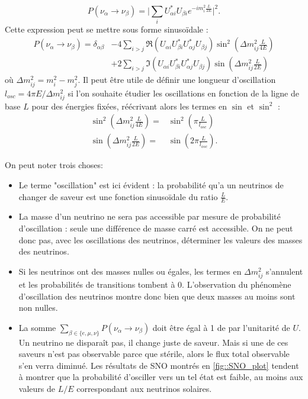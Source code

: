             \begin{equation*}
                P(\nu_{\alpha}\to\nu_{\beta}) = \bigg|\sum_i U_{\alpha i}^*U_{\beta i} e^{-im_i^2\frac{L}{2E}}\bigg|^2.
            \end{equation*}
            Cette expression peut se mettre sous forme sinusoïdale\cite{Mondal2015} :
            \begin{equation}\label{eq::proba_oscillation}
                \begin{split}
                    P(\nu_{\alpha}\to\nu_{\beta}) = \delta_{\alpha\beta} & - 4\sum_{i>j}\Re(U_{\alpha i}U_{\beta i}^*U_{\alpha j}^*U_{\beta j})\sin^2\left(\Delta m_{ij}^2\frac{L}{4E}\right) \\
                    & +2\sum_{i>j}\Im(U_{\alpha i}U_{\beta i}^*U_{\alpha j}^*U_{\beta j})\sin\left(\Delta m_{ij}^2\frac{L}{2E}\right)
                \end{split}
            \end{equation}
            où $\Delta m_{ij}^2 = m_i^2-m_j^2$. Il peut être utile de définir une longueur d'oscillation $l_{osc} = 4\pi E/\Delta m_{ij}^2$ si l'on souhaite étudier les oscillations en fonction de la ligne de base $L$ pour des énergies fixées, réécrivant alors les termes en $\sin$ et $\sin^2$ :
            \begin{eqnarray}
                \sin^2\left(\Delta m_{ij}^2\frac{L}{4E}\right) = &  \sin^2\left(\pi\frac{L}{l_{osc}}\right) \\
                \sin\left(\Delta m_{ij}^2\frac{L}{2E}\right) = & \sin\left(2\pi\frac{L}{l_{osc}}\right).
            \end{eqnarray}
            
            On peut noter trois choses:
            \begin{itemize}
                \item Le terme "oscillation" est ici évident : la probabilité qu'a un neutrinos de changer de saveur est une fonction sinusoïdale du ratio $\frac{L}{E}$. 
                \item La masse d'un neutrino ne sera pas accessible par mesure de probabilité d'oscillation : seule une différence de masse carré est accessible. On ne peut donc pas, avec les oscillations des neutrinos, déterminer les valeurs des masses des neutrinos.
                \item Si les neutrinos ont des masses nulles ou égales, les termes en $\Delta m_{ij}^2$ s'annulent et les probabilités de transitions tombent à 0. L'observation du phénomène d'oscillation des neutrinos montre donc bien que deux masses au moins sont non nulles.
                \item La somme $\sum_{\beta\in\{e,\mu,\nu\}}P(\nu_{\alpha}\to\nu_{\beta})$ doit être égal à 1 de par l'unitarité de $U$. Un neutrino ne disparaît pas, il change juste de saveur. Mais si une de ces saveurs n'est pas observable parce que stérile, alors le flux total observable s'en verra diminué. Les résultats de SNO montrés en \autoref{fig::SNO_plot} tendent à montrer que la probabilité d'osciller vers un tel état est faible, au moins aux valeurs de $L/E$ correspondant aux neutrinos solaires.
            \end{itemize}
            
